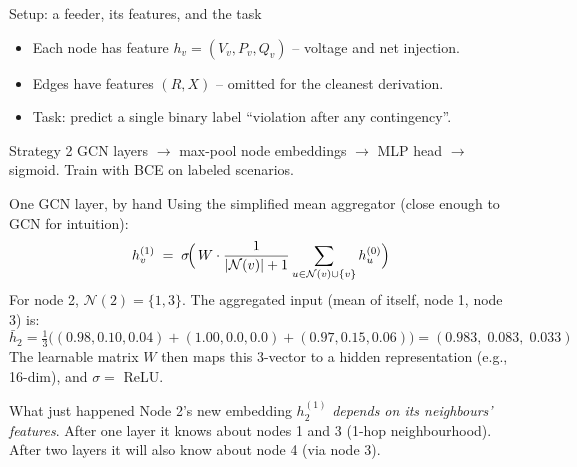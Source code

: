 \documentclass[aspectratio=169,10pt]{beamer}
\begin{document}
\begin{frame}{Setup: a feeder, its features, and the task}
\centering
{}
\vspace{0.3em}
\begin{itemize}
  \item Each node has feature $h_v = (V_v, P_v, Q_v)$ -- voltage and net injection.
  \item Edges have features $(R, X)$ -- omitted for the cleanest derivation.
  \item Task: predict a single binary label ``violation after any contingency''.
\end{itemize}
\vspace{0.3em}
\begin{block}{Strategy}
2 GCN layers $\to$ max-pool node embeddings $\to$ MLP head $\to$ sigmoid. Train with BCE on labeled scenarios.
\end{block}
\end{frame}

\begin{frame}{One GCN layer, by hand}
Using the simplified mean aggregator (close enough to GCN for intuition):
\begin{equation*}
h_v^{(1)} \;=\; \sigma\!\Bigl(\, W \cdot \frac{1}{|\mathcal{N}(v)| + 1} \sum_{u \in \mathcal{N}(v) \cup \{v\}} h_u^{(0)} \Bigr)
\end{equation*}
\vspace{0.2em}
For node 2, $\mathcal{N}(2) = \{1, 3\}$. The aggregated input (mean of itself, node 1, node 3) is:
\begin{equation*}
\bar{h}_2 = \tfrac{1}{3}\bigl( (0.98, 0.10, 0.04) + (1.00, 0.0, 0.0) + (0.97, 0.15, 0.06) \bigr) = (0.983,\; 0.083,\; 0.033)
\end{equation*}
The learnable matrix $W$ then maps this 3-vector to a hidden representation (e.g., 16-dim), and $\sigma = $ ReLU.
\vspace{0.4em}
\begin{block}{What just happened}
Node 2's new embedding $h_2^{(1)}$ \emph{depends on its neighbours' features}. After one layer it knows about nodes 1 and 3 (1-hop neighbourhood). After two layers it will also know about node 4 (via node 3).
\end{block}
\end{frame}
\end{document}
